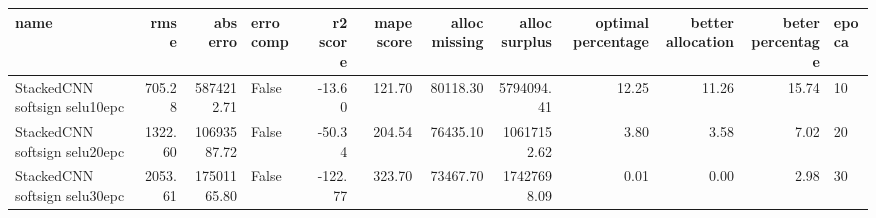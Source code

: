 \begin{tabular}{lrrlrrrrrrrl}
\toprule
name & rmse & abs erro & erro comp & r2 score & mape score & alloc missing & alloc surplus & optimal percentage & better allocation & beter percentage & epoca \\
\midrule
StackedCNN softsign selu10epc & 705.28 & 5874212.71 & False & -13.60 & 121.70 & 80118.30 & 5794094.41 & 12.25 & 11.26 & 15.74 & 10 \\
StackedCNN softsign selu20epc & 1322.60 & 10693587.72 & False & -50.34 & 204.54 & 76435.10 & 10617152.62 & 3.80 & 3.58 & 7.02 & 20 \\
StackedCNN softsign selu30epc & 2053.61 & 17501165.80 & False & -122.77 & 323.70 & 73467.70 & 17427698.09 & 0.01 & 0.00 & 2.98 & 30 \\
\bottomrule
\end{tabular}
